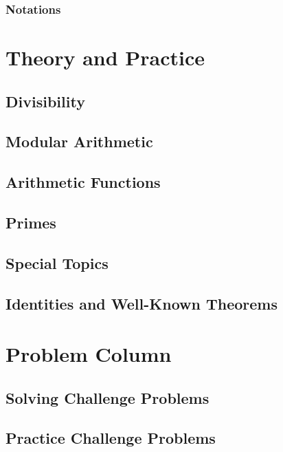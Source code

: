 \documentclass[leqno, 12pt]{book}
\begin{document}
	\dominitoc
	
\tableofcontents


\pagestyle{myfancy}
\pagestyle{fancy}

\mainmatter

\setcounter{page}{13}

	\section*{Notations}
	
\part{Theory and Practice}
	\chapter{Divisibility}\label{ch:divisibility}
	\minitoc \mtcskip \minilof
		
	\chapter{Modular Arithmetic}\label{ch:congruence}
	\minitoc \mtcskip \minilof
		
	\chapter{Arithmetic Functions}\label{ch:arithfunc}
	 \minitoc \mtcskip \minilof
		
	\chapter{Primes}\label{ch:primes}
	\minitoc \mtcskip \minilof
		
	\chapter{Special Topics}\label{ch:special}
	\minitoc \mtcskip \minilof
		
	\begin{appendix}\label{ch:appendices}
		\appendixpage
		\noappendicestocpagenum
		\addappheadtotoc
		\chapter{Identities and Well-Known Theorems}\label{ch:null}
			
	\end{appendix}
	\resumechapters	
\part{Problem Column}
	\chapter{Solving Challenge Problems}\label{ch:solved}
		
	\chapter{Practice Challenge Problems}\label{ch:unsolved}
		
		
\end{document}
